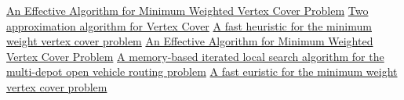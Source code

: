 \documentclass[11pt]{article}
\begin{document}
\begin{thebibliography}{6}

 \href{https://www.researchgate.net/publication/242463011_An_Effective_Algorithm_for_Minimum_Weighted_Vertex_Cover_problem}{An Effective Algorithm for Minimum Weighted Vertex Cover Problem}
 \href{https://www.cs.umd.edu/class/fall2018/cmsc858E/pdfs/651/vc.pdf} {Two approximation algorithm for Vertex Cover} 
 \href{https://ieeexplore.ieee.org/abstract/document/7550782}{A fast heuristic for the minimum weight vertex cover problem}
 \href{https://www.researchgate.net/publication/242463011_An_Effective_Algorithm_for_Minimum_Weighted_Vertex_Cover_problem}{An Effective Algorithm for Minimum Weighted Vertex Cover Problem}
 \href{https://www.sciencedirect.com/science/article/abs/pii/S0377221720300278}{A memory-based iterated local search algorithm for the multi-depot open vehicle routing problem}
 \href{https://ieeexplore.ieee.org/document/7550782}{A fast euristic for the minimum weight vertex cover problem}

\end{thebibliography}


\pagebreak
\end{document}
